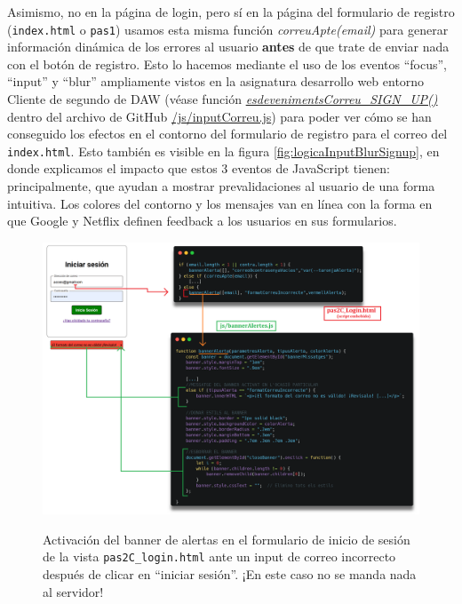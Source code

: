 \documentclass[a4paper,12pt]{report}
\begin{document}
		Asimismo, no en la página de login, pero sí en la página del formulario de registro (\texttt{index.html} o \texttt{pas1}) usamos esta misma función \textit{correuApte(email)} para generar información dinámica de los errores al usuario \textbf{antes} de que trate de enviar nada con el botón de registro. Esto lo hacemos mediante el uso de los eventos ``focus'', ``input'' y ``blur'' ampliamente vistos en la asignatura desarrollo web entorno Cliente de segundo de DAW (véase función \href{https://github.com/blackcub3s/mercApp/blob/07d597e69f7590cdb2dfeea512a8b45bbc9194b3/APP%20WEB/__frontend__produccio__/app/js/inputCorreu.js#L101-L149}{\textit{esdevenimentsCorreu\_SIGN\_UP()}} dentro del archivo de GitHub \href{https://github.com/blackcub3s/mercApp/blob/main/APP%20WEB/__frontend__produccio__/app/js/inputCorreu.js}{/js/inputCorreu.js}) para poder ver cómo se han conseguido los efectos en el contorno del formulario de registro para el correo del \texttt{index.html}. Esto también es visible en la figura \ref{fig:logicaInputBlurSignup}, en donde explicamos el impacto que estos 3 eventos de JavaScript tienen: principalmente, que ayudan a mostrar prevalidaciones al usuario de una forma intuitiva. Los colores del contorno y los mensajes van en línea con la forma en que Google y Netflix definen feedback a los usuarios en sus formularios.
		
		\FloatBarrier
		\setlength{\belowcaptionskip}{3pt}
		\begin{figure}[H]
			\centering
			\caption{Activación del banner de alertas en el formulario de inicio de sesión de la vista \texttt{pas2C\_login.html} ante un input de correo incorrecto después de clicar en ``iniciar sesión''. ¡En este caso no se manda nada al servidor!}
			\includegraphics[width=.8\linewidth]{img/activacioBannerAlertesLoginCorreu}
			\label{fig:activacioBannerAlertesLoginCorreu}
		\end{figure}
		\FloatBarrier
		
\end{document}
